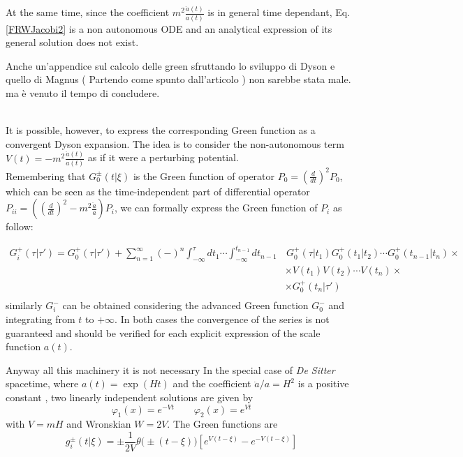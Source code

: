 \documentclass[Main]{subfiles}
\begin{document}
			At the same time, since the coefficient $m^2 \frac{\ddot{a}(t)}{a(t)}$ is in general time dependant,  Eq. \ref{FRWJacobi2} is a non autonomous ODE and an analytical expression of its general solution does not exist.
\ifToninus
	\begin{Warning}	
		Anche un'appendice sul calcolo delle green sfruttando lo sviluppo di Dyson e quello di Magnus ( Partendo come spunto dall'articolo \cite{Dappiaggi2014}) non sarebbe stata male. ma è venuto il tempo di concludere.
	\end{Warning}
\fi	
			\\
			It is possible, however, to express the corresponding Green function as a convergent Dyson expansion\cite{Dappiaggi2014}.
			The idea is to consider the non-autonomous term $V(t) = -m^2 \frac{\ddot{a}(t)}{a(t)}$ as if it were a perturbing potential.\\
			Remembering that $G^\pm_0 (t \vert \xi)$ is the Green function of operator \ifToninus$P_{0}=\left(\frac{d}{dt}\right)^2$\else$P_0$\fi, which can be seen as the time-independent part of differential operator \ifToninus$P_{i i}=\left( \left(\frac{d}{dt}\right)^2 - m^2 \frac{\ddot{a}}{a} \right)$\else$P_i$\fi, we can formally express the Green function of $P_{i}$ as follow:
			
			\begin{align*}
				G^+_i ( \tau \vert \tau' ) = G^+_0( \tau \vert \tau' ) + \sum_{n=1}^\infty (-)^n 
				\int_{-\infty}^\tau dt_1 \cdots \int_{-\infty}^{t_{n-1}} dt_{n-1} 
				& \,  G^+_0(\tau \vert t_1) G^+_0(t_1\vert t_2) \cdots G^+_0(t_{n-1} \vert t_n) \times \\
				& \times  V(t_1) V(t_2) \cdots V(t_n) \times \\
				& \times  G^+_0 (t_n \vert \tau' ) \\
			\end{align*}		
			similarly $G^-_i$  can be obtained considering the advanced Green function $G^-_0$ and integrating from $t$ to $+\infty$.
			In both cases the convergence of the series is not guaranteed and should be verified for each explicit expression of the scale function $a (t)$.
			
			\vspace{2mm}
			\ifToninus Anyway all this machinery it is not necessary \fi In the special case of \emph{De Sitter} spacetime, where $ a(t) = \exp(H t)$ and the coefficient $\ddot{a}/a=H^2$ is a positive constant  \cite{Wald1984}, 
			two linearly independent solutions are given by
			\begin{displaymath}
				\varphi_1(x) = e^{-V t} \qquad \varphi_2(x)= e^{Vt}
			\end{displaymath}
			with $V=m H$ and Wronskian $W= 2V$.
			The Green functions are
			\begin{displaymath}
								g^\pm_i(t \vert \xi) = \pm \frac{1}{2V}\theta\big(\pm(t-\xi)\big) \left[ e^{V(t-\xi)} - e^{-V(t-\xi)}\right]
			\end{displaymath}
\end{document}
